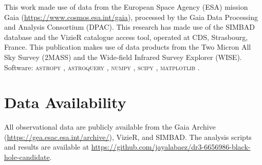 \documentclass[usenatbib,fleqn]{mnras}
\begin{document}
This work made use of data from the European Space Agency (ESA)
mission Gaia (\url{https://www.cosmos.esa.int/gaia}), processed by
the Gaia Data Processing and Analysis Consortium (DPAC).
This research has made use of the SIMBAD database and the VizieR
catalogue access tool, operated at CDS, Strasbourg, France.
This publication makes use of data products from the Two Micron All
Sky Survey (2MASS) and the Wide-field Infrared Survey Explorer
(WISE).  Software: \textsc{astropy} \citep{Astropy2022},
\textsc{astroquery} \citep{Astroquery2019}, \textsc{numpy}
\citep{Harris2020}, \textsc{scipy} \citep{Virtanen2020},
\textsc{matplotlib} \citep{Hunter2007}.

\section*{Data Availability}

All observational data are publicly available from the Gaia Archive
(\url{https://gea.esac.esa.int/archive/}), VizieR, and SIMBAD.
The analysis scripts and results are available at
\url{https://github.com/jayalabaez/dr3-6656986-black-hole-candidate}.




\end{document}
